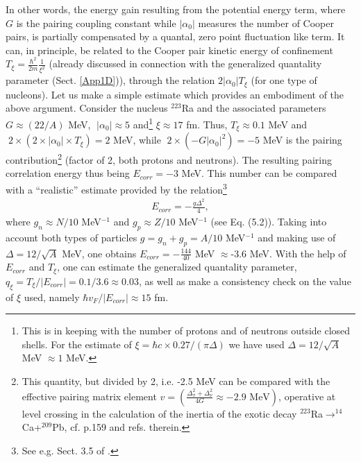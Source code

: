  
 
 
 In other words, the energy gain resulting from the potential energy term, where $G$ is the pairing coupling constant while $|\alpha_0|$ measures the number of Cooper pairs, is partially compensated by a quantal, zero point fluctuation like term. It can, in principle, be related to the Cooper pair kinetic energy of confinement $T_\xi=\frac{\hbar^2}{2m}\frac{1}{\xi^2}$ (already discussed in connection with the generalized quantality parameter (Sect. \ref{App1D})), through the relation $2|\alpha_0|T_\xi$ (for one type of nucleons). Let us make a simple estimate which  provides an embodiment  of the above argument. Consider the nucleus $^{223}$Ra and the associated parameters $G\approx(22/A)$ MeV,      $\;|\alpha_0|\approx 5$ and\footnote{This is in keeping with the number of protons and of neutrons outside closed shells. For the estimate of $\xi=\hbar c\times0.27/(\pi\Delta)$ we have used $\Delta=12/\sqrt{A}$ MeV $\approx1$ MeV.} $\xi\approx 17$ fm. Thus,  $T_\xi\approx 0.1$ MeV and $\;2\times(2\times|\alpha_0|\times T_\xi)=2$ MeV, while $\;2\times (-G|\alpha_0|^2)=-5$ MeV is the pairing contribution\footnote{This quantity, but divided by 2, i.e. -2.5 MeV can be compared with the effective pairing matrix element $v=\left(\frac{\Delta_\pi^2+\Delta_\nu^2}{4G}\approx -2.9 \text{ MeV}\right)$, operative at level crossing in the calculation of the inertia of the exotic decay $^{223}$Ra$\rightarrow^{14}$Ca+$^{209}$Pb, cf. \cite{Brink:05} p.159 and refs. therein.} (factor of 2, both protons and neutrons). The resulting pairing correlation energy thus being $E_{corr}=-3$ MeV. This number can be compared with a ``realistic'' estimate provided by the relation\footnote{See e.g. Sect. 3.5 of \cite{Brink:05}.}
   \begin{align}\label{eq3B21}
E_{corr}=-\frac{g\Delta^2}{4},
   \end{align}  
 where $g_n\approx N/10$ MeV$^{-1}$ and $g_p\approx Z/10$ MeV$^{-1}$ (see \cite{Bortignon:98} Eq. (5.2)). Taking into account both types of particles $g=g_n+g_p=A/10$ MeV$^{-1}$ and making use of $\Delta=12/\sqrt{A}$ MeV, one obtains $E_{corr}=-\frac{144}{40}$ MeV $\approx$-3.6 MeV. With the help of $E_{corr}$ and $T_\xi$, one can estimate the generalized quantality parameter, $q_\xi=T_\xi/|E_{corr}|=0.1/3.6\approx 0.03$, as well as make a consistency check  on the value of $\xi$ used, namely $\hbar v_F/|E_{corr}|\approx 15$ fm.
 
